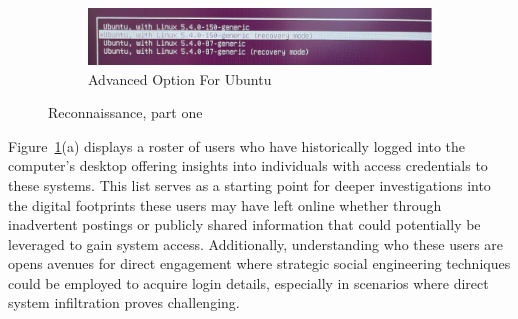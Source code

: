 \documentclass[manuscript,acmsmall,anonymous,review,screen,nonacm=true, authorversion=true]{acmart}
\begin{document}
\begin{figure}
\begin{subfigure}{.5\textwidth}
    \begin{centering}
    \includegraphics[scale=0.5]{pict/Picture4.png}
    \caption{Advanced Option For Ubuntu}
    \end{centering}
\end{subfigure}
\caption{Reconnaissance, part one}
    \label{fig:1}
\end{figure}

Figure~\ref{fig:1}(a) displays a roster of users who have historically logged into the computer's
desktop offering insights into individuals with access credentials to these systems. This list
serves as a starting point for deeper investigations into the digital footprints these users may have
left online whether through inadvertent postings or publicly shared information that could
potentially be leveraged to gain system access. Additionally, understanding who these users
are opens avenues for direct engagement where strategic social engineering techniques could be
employed to acquire login details, especially in scenarios where direct system infiltration proves
challenging.
\end{document}
